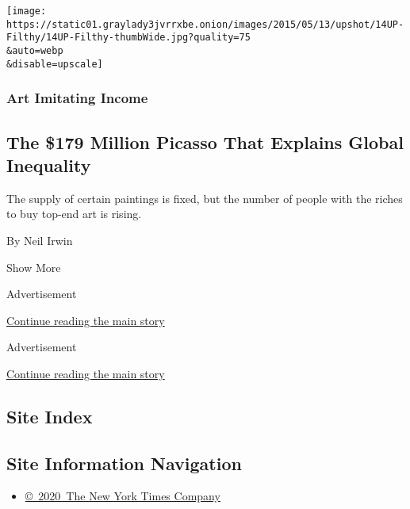 \begin{enumerate}
  \texttt{[image: https://static01.graylady3jvrrxbe.onion/images/2015/05/13/upshot/14UP-Filthy/14UP-Filthy-thumbWide.jpg?quality=75\\\&auto=webp\\\&disable=upscale]}

  \hypertarget{art-imitating-income}{%
  \subsubsection{Art Imitating Income}\label{art-imitating-income}}

  \hypertarget{the-179-million-picasso-that-explains-global-inequality}{%
  \subsection{The \$179 Million Picasso That Explains Global
  Inequality}\label{the-179-million-picasso-that-explains-global-inequality}}

  The supply of certain paintings is fixed, but the number of people
  with the riches to buy top-end art is rising.

  By Neil Irwin
\end{enumerate}

Show More

Advertisement

\protect\hyperlink{after-mid1}{Continue reading the main story}

Advertisement

\protect\hyperlink{after-mktg}{Continue reading the main story}

\hypertarget{site-index}{%
\subsection{Site Index}\label{site-index}}

\hypertarget{site-information-navigation}{%
\subsection{Site Information
Navigation}\label{site-information-navigation}}

\begin{itemize}
\tightlist
\item
  \href{https://help.nytimes3xbfgragh.onion/hc/en-us/articles/115014792127-Copyright-notice}{©~2020~The
  New York Times Company}
\end{itemize}

